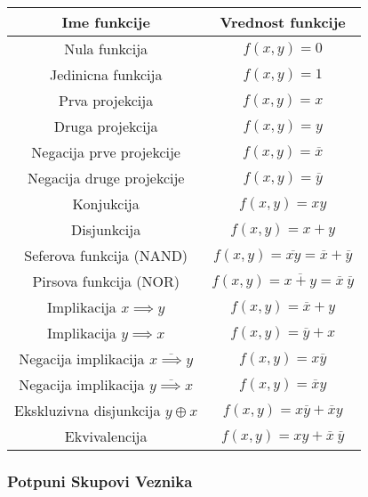 \documentclass[12p, a4paper]{article}
\begin{document}
\begin{multicols}{2}
    \begin{tabular}{*{2}{c}}
        Ime funkcije                                    & Vrednost funkcije \\
        \midrule
        Nula funkcija                                   & $f(x, y) = 0$ \\
        Jedinicna funkcija                              & $f(x, y) = 1$ \\
        Prva projekcija                                 & $f(x, y) = x$ \\
        Druga projekcija                                & $f(x, y) = y$ \\
        Negacija prve projekcije                        & $f(x, y) = \overline{x}$ \\
        Negacija druge projekcije                       & $f(x, y) = \overline{y}$ \\
        Konjukcija                                      & $f(x, y) = x y$ \\
        Disjunkcija                                     & $f(x, y) = x + y$ \\
        Seferova funkcija (NAND)                        & $f(x, y) = \overline{xy} = \overline{x} + \overline{y}$ \\
        Pirsova funkcija (NOR)                          & $f(x, y) = \overline{x + y} = \overline{x} \ \overline{y}$ \\
        Implikacija $x \implies y$                      & $f(x, y) = \overline{x} + y$ \\
        Implikacija $y \implies x$                      & $f(x, y) = \overline{y} + x$ \\
        Negacija implikacija $\overline{x \implies y}$  & $f(x, y) = x \overline{y}$ \\
        Negacija implikacija $\overline{y \implies x}$  & $f(x, y) = \overline{x} y$ \\
        Ekskluzivna disjunkcija $y \oplus x$            & $f(x, y) = x \overline{y} + \overline{x} y$ \\
        Ekvivalencija                                   & $f(x, y) = x y + \overline{x} \ \overline{y}$ \\
    \end{tabular}

    \subsubsection{Potpuni Skupovi Veznika}


\end{multicols}
\end{document}
